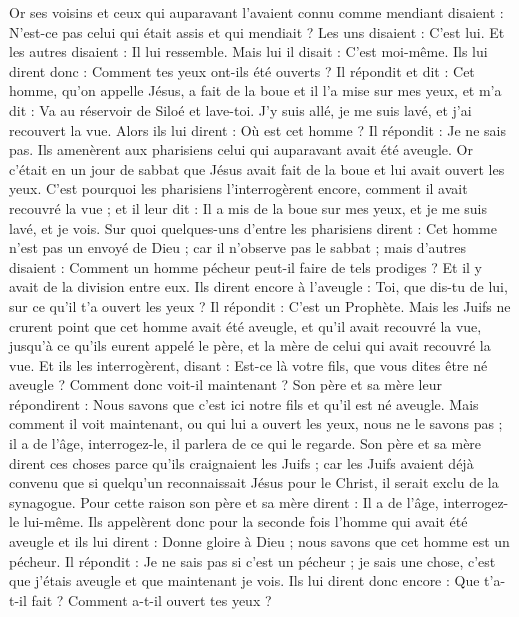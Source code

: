 \begin{multicols}{2}
Or ses voisins et ceux qui auparavant l'avaient connu comme mendiant disaient : N'est-ce pas celui qui était assis et qui mendiait ?
Les uns disaient : C'est lui. Et les autres disaient : Il lui ressemble. Mais lui il disait : C'est moi-même.
Ils lui dirent donc : Comment tes yeux ont-ils été ouverts ?
Il répondit et dit : Cet homme, qu'on appelle Jésus, a fait de la boue et il l'a mise sur mes yeux, et m'a dit : Va au réservoir de Siloé et lave-toi. J'y suis allé, je me suis lavé, et j'ai recouvert la vue.
Alors ils lui dirent : Où est cet homme ? Il répondit : Je ne sais pas.
Ils amenèrent aux pharisiens celui qui auparavant avait été aveugle.
Or c'était en un jour de sabbat que Jésus avait fait de la boue et lui avait ouvert les yeux.
C'est pourquoi les pharisiens l'interrogèrent encore, comment il avait recouvré la vue ; et il leur dit : Il a mis de la boue sur mes yeux, et je me suis lavé, et je vois.
Sur quoi quelques-uns d'entre les pharisiens dirent : Cet homme n'est pas un envoyé de Dieu ; car il n'observe pas le sabbat ; mais d'autres disaient : Comment un homme pécheur peut-il faire de tels prodiges ? Et il y avait de la division entre eux.
Ils dirent encore à l'aveugle : Toi, que dis-tu de lui, sur ce qu'il t'a ouvert les yeux ? Il répondit : C'est un Prophète.
Mais les Juifs ne crurent point que cet homme avait été aveugle, et qu'il avait recouvré la vue, jusqu'à ce qu'ils eurent appelé le père, et la mère de celui qui avait recouvré la vue.
Et ils les interrogèrent, disant : Est-ce là votre fils, que vous dites être né aveugle ? Comment donc voit-il maintenant ?
Son père et sa mère leur répondirent : Nous savons que c'est ici notre fils et qu'il est né aveugle.
Mais comment il voit maintenant, ou qui lui a ouvert les yeux, nous ne le savons pas ; il a de l'âge, interrogez-le, il parlera de ce qui le regarde.
Son père et sa mère dirent ces choses parce qu'ils craignaient les Juifs ; car les Juifs avaient déjà convenu que si quelqu'un reconnaissait Jésus pour le Christ, il serait exclu de la synagogue.
Pour cette raison son père et sa mère dirent : Il a de l'âge, interrogez-le lui-même.
Ils appelèrent donc pour la seconde fois l'homme qui avait été aveugle et ils lui dirent : Donne gloire à Dieu ; nous savons que cet homme est un pécheur.
Il répondit : Je ne sais pas si c'est un pécheur ; je sais une chose, c'est que j'étais aveugle et que maintenant je vois.
Ils lui dirent donc encore : Que t'a-t-il fait ? Comment a-t-il ouvert tes yeux ?

\end{multicols}
